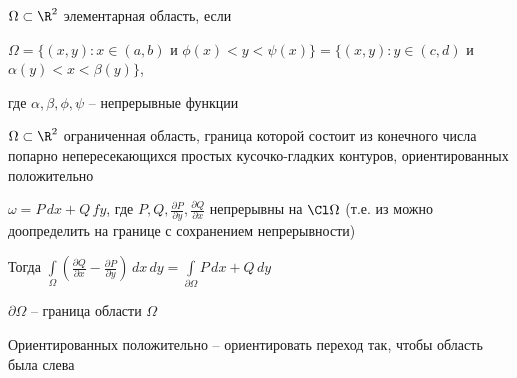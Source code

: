
\begin{definition}\thmslashn
	
	$\Omega \subset \R^2$ элементарная область, если 
	
	$\Omega = \{ (x, y): x \in (a, b) $ и $ \phi(x) < y < \psi(x) \} = \{ (x, y): y \in (c, d) $ и $ \alpha(y) < x < \beta(y) \}$, 
	
	где $\alpha, \beta, \phi, \psi$ -- непрерывные функции
	
\end{definition}

\begin{theorem}\thmslashn
	
	$\Omega \subset \R^2$ ограниченная область, граница которой состоит из конечного числа попарно непересекающихся простых кусочко-гладких контуров, ориентированных положительно
	
	$\omega = P\,dx + Q\,fy$, где $P, Q, \frac{\partial P}{\partial y}, \frac{\partial Q}{\partial x}$ непрерывны на $\Cl \Omega$ (т.е. из можно доопределить на границе с сохранением непрерывности)
	
	Тогда $\int\limits_\Omega \left( \frac{\partial Q}{\partial x}-\frac{\partial P}{\partial y} \right) \,dx\,dy = \int\limits_{\partial \Omega} P\,dx + Q\,dy$
	
\end{theorem}

\begin{remark_author}\thmslashn

	$\partial \Omega$ -- граница области $\Omega$
	
	Ориентированных положительно -- ориентировать переход так, чтобы область была слева

\end{remark_author}

